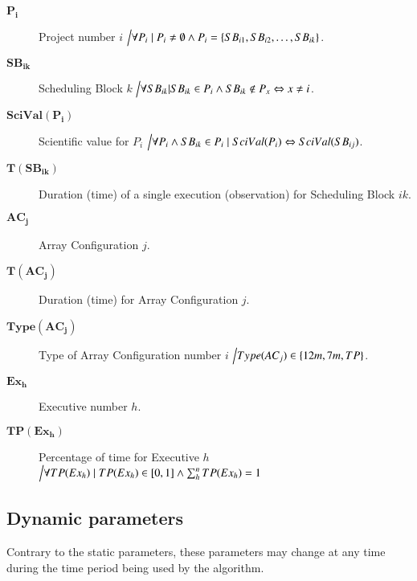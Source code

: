 \begin{description}
\item[$\mathbf{P_i}$] Project number $i$ $\Big\slash \forall P_i \mid P_i \neq \emptyset \land P_i = \{SB_{i1}, SB_{i2}, \ldots, SB_{ik}\}$.

\item[$\mathbf{SB_{ik}}$] Scheduling Block $k$ $\Big\slash \forall SB_{ik} | SB_{ik} \in P_i \land SB_{ik} \notin P_x \Leftrightarrow x \neq i$.

\item[$\mathbf{SciVal(P_i)}$] Scientific value for $P_i$ $\Big\slash \forall P_i \land SB_{ik} \in P_i \mid SciVal(P_i) \Leftrightarrow SciVal(SB_{ij}) $.

\item[$\mathbf{T(SB_{ik})}$] Duration (time) of a single execution (observation) for Scheduling Block $ik$.

\item[$\mathbf{AC_j}$] Array Configuration $j$.

\item[$\mathbf{T(AC_j)}$] Duration (time) for Array Configuration $j$.

\item[$\mathbf{Type(AC_j)}$] Type of Array Configuration number $i$ $\Big\slash Type(AC_j) \in \{12m, 7m, TP\}$.

\item[$\mathbf{Ex_h}$] Executive number $h$.

\item[$\mathbf{TP(Ex_h)}$] Percentage of time for Executive $h$ $\Big\slash \forall TP(Ex_h) \mid TP(Ex_h) \in {[0,1]} \land \sum_{h}^{n} TP(Ex_h) = 1$ 

\end{description} 

\subsection{Dynamic parameters}
Contrary to the static parameters, these parameters may change at any time during the time period being used by the algorithm.

